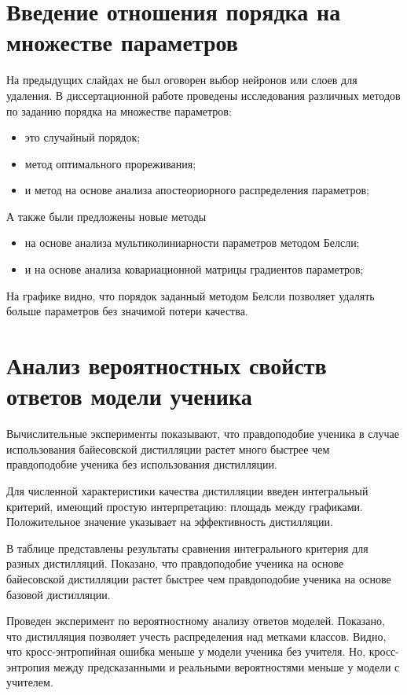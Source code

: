\documentclass[10pt, twoside]{article}
\begin{document}
\section{Введение отношения порядка на множестве параметров}
На предыдущих слайдах не был оговорен выбор нейронов или слоев для удаления. В диссертационной работе проведены исследования различных методов по заданию порядка на множестве параметров:
\begin{itemize}
    \item это случайный порядок;
    \item метод оптимального прореживания;
    \item и метод на основе анализа апостеориорного распределения параметров;
\end{itemize}
А также были предложены новые методы
\begin{itemize}
    \item на основе анализа мультиколиниарности параметров методом Белсли;
    \item и на основе анализа ковариационной матрицы градиентов параметров;
\end{itemize}

На графике видно, что порядок заданный методом Белсли позволяет удалять больше параметров без значимой потери качества.

\section{Анализ вероятностных свойств ответов модели ученика}
Вычислительные эксперименты показывают, что правдоподобие ученика в случае использования байесовской дистилляции растет много быстрее чем правдоподобие ученика без использования дистилляции.

Для численной характеристики качества дистилляции введен интегральный критерий, имеющий простую интерпретацию: площадь между графиками. Положительное значение указывает на эффективность дистилляции.

В таблице представлены результаты сравнения интегрального критерия для разных дистилляций. Показано, что правдоподобие ученика на основе байесовской дистилляции растет быстрее чем правдоподобие ученика на основе базовой дистилляции.

Проведен эксперимент по вероятностному анализу ответов моделей. Показано, что дистилляция позволяет учесть распределения над метками классов. Видно, что кросс-энтропийная ошибка меньше у модели ученика без учителя. Но, кросс-энтропия между предсказанными и реальными вероятностями меньше у модели с учителем.
\end{document}
